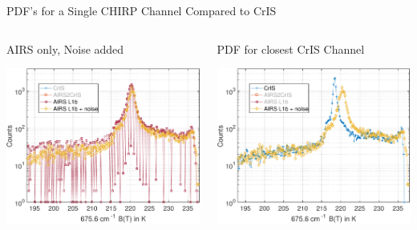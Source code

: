 \documentclass[10pt,t]{beamer}
\begin{document}
\begin{frame}[label={sec:orgbf8eb33}]{PDF's for a Single CHIRP Channel Compared to CrIS}
\vspace{-0.35in}
\begin{columns}
\begin{column}{0.55\columnwidth}
\begin{block}{\footnotesize AIRS only, Noise added}
\vspace{-0.05in}
\vspace{-0.05in}
\begin{center}
\includegraphics[width=0.77\linewidth]{./Figs/Pdf/jun4_2015_airs_675wn_global_counts_w_airsnoise.pdf}
\end{center}
\end{block}
\end{column}

\begin{column}{0.55\columnwidth}
\begin{block}{\footnotesize PDF for closest CrIS Channel}
\vspace{-0.05in}
\vspace{-0.05in}
\begin{center}
\includegraphics[width=0.77\linewidth]{./Figs/Pdf/jun4_2015_airs_675wn_global_counts_w_airsnoise_and_cris.pdf}
\end{center}
\end{block}
\end{column}
\end{columns}


\end{frame}
\end{document}
